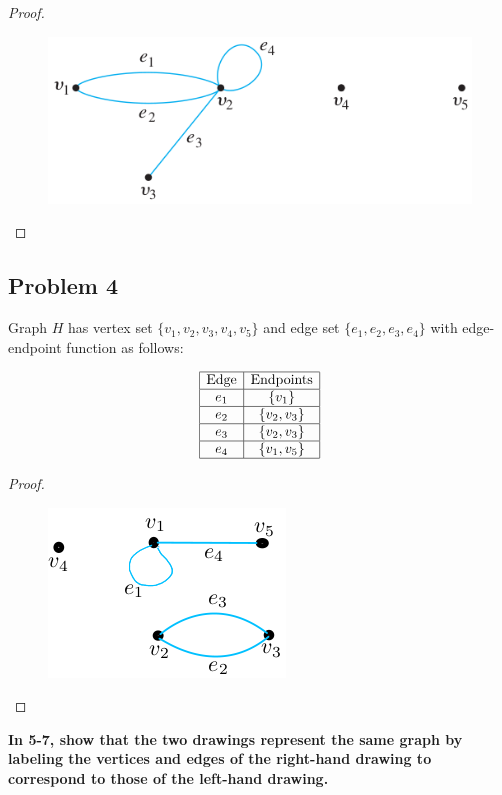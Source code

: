 \documentclass[14pt]{extarticle}
\begin{document}
\begin{proof}
\begin{figure}[ht!]
\centering
\includegraphics[scale=0.5]{../images/1.4.3.sol.png}
\end{figure}
\end{proof}

\subsection{Problem 4}
Graph $H$ has vertex set $\{v_1, v_2, v_3, v_4, v_5\}$ and edge set $\{e_1,
e_2, e_3, e_4\}$ with edge-endpoint function as follows:

$$
\begin{array}{|c|c|}
\hline
\text{Edge} & \text{Endpoints} \\
\hline
e_1 & \{v_1\} \\
\hline
e_2 & \{v_2, v_3\} \\
\hline
e_3 & \{v_2, v_3\} \\
\hline
e_4 & \{v_1, v_5\} \\
\hline
\end{array}
$$

\begin{proof}
\begin{figure}[ht!]
\centering
\includegraphics[scale=0.5]{../images/1.4.4.sol.png}
\end{figure}
\end{proof}

{\bf In 5-7, show that the two drawings represent the same graph by labeling
the vertices and edges of the right-hand drawing to correspond to those of the
left-hand drawing.}
\end{document}
